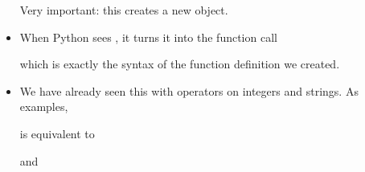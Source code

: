 \documentclass[letterpaper,10pt,english]{sphinxmanual}
\begin{document}
\begin{itemize}
%
\begin{sphinxVerbatim}[commandchars=\\\{\}]
 
         
\end{sphinxVerbatim}

Very important:  this creates a new  object.

\item {} 
When Python sees , it turns it into the function call

%
\begin{sphinxVerbatim}[commandchars=\\\{\}]
\end{sphinxVerbatim}

which is exactly the syntax of the function definition we created.

\item {} 
We have already seen this with operators on integers and strings.
As examples,

%
\begin{sphinxVerbatim}[commandchars=\\\{\}]
\end{sphinxVerbatim}

is equivalent to

%
\begin{sphinxVerbatim}[commandchars=\\\{\}]
\end{sphinxVerbatim}

and

%
\begin{sphinxVerbatim}[commandchars=\\\{\}]
\end{sphinxVerbatim}


\end{itemize}
\end{document}
